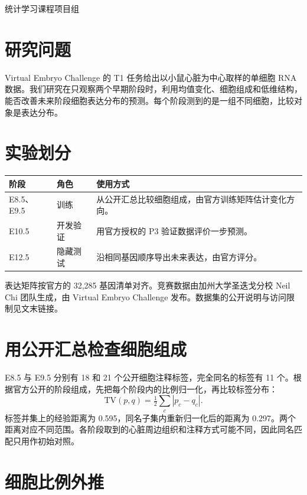 \documentclass[UTF8,zihao=-4,fontset=none,a4paper]{ctexart}
\begin{document}


\noindent 统计学习课程项目组

\section*{研究问题}

Virtual Embryo Challenge 的 T1 任务给出以小鼠心脏为中心取样的单细胞 RNA 数据。我们研究在只观察两个早期阶段时，利用均值变化、细胞组成和低维结构，能否改善未来阶段细胞表达分布的预测。每个阶段测到的是一组不同细胞，比较对象是表达分布。

\section*{实验划分}

\noindent\begin{tabularx}{\linewidth}{@{}l l Y@{}}
\toprule
阶段 & 角色 & 使用方式 \\
\midrule
E8.5、E9.5 & 训练 & 从公开汇总比较细胞组成，由官方训练矩阵估计变化方向。\\
E10.5 & 开发验证 & 用官方授权的 P3 验证数据评价一步预测。\\
E12.5 & 隐藏测试 & 沿相同基因顺序导出未来表达，由官方评分。\\
\bottomrule
\end{tabularx}

\noindent 表达矩阵按官方的 32,285 基因清单对齐。竞赛数据由加州大学圣迭戈分校 Neil Chi 团队生成，由 Virtual Embryo Challenge 发布。数据集的公开说明与访问限制见文末链接。

\section*{用公开汇总检查细胞组成}

E8.5 与 E9.5 分别有 18 和 21 个公开细胞注释标签，完全同名的标签有 11 个。根据官方公开的阶段组成，先把每个阶段内的比例归一化，再比较标签分布：
\[
\mathrm{TV}(p,q)=\tfrac{1}{2}\sum_c|p_c-q_c|.
\]
标签并集上的经验距离为 0.595，同名子集内重新归一化后的距离为 0.297。两个距离对应不同范围。各阶段取到的心脏周边组织和注释方式可能不同，因此同名匹配只用作初始对照。

\newpage
\section*{细胞比例外推}
\end{document}
